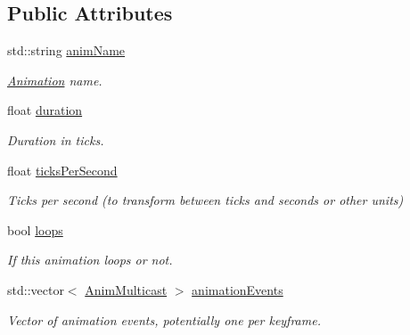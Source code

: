 \subsection*{Public Attributes}
\begin{DoxyCompactItemize}
\item 
\mbox{\label{structAnimation_a0447169235a9232787743cd944752b3f}} 
std\+::string \hyperlink{structAnimation_a0447169235a9232787743cd944752b3f}{anim\+Name}
\begin{DoxyCompactList}\small\item\em \hyperlink{structAnimation}{Animation} name. \end{DoxyCompactList}\item 
\mbox{\label{structAnimation_a66cc7333638f071b0401072ba95c55fd}} 
float \hyperlink{structAnimation_a66cc7333638f071b0401072ba95c55fd}{duration}
\begin{DoxyCompactList}\small\item\em Duration in ticks. \end{DoxyCompactList}\item 
\mbox{\label{structAnimation_a929555773b65c756af1519fc39317560}} 
float \hyperlink{structAnimation_a929555773b65c756af1519fc39317560}{ticks\+Per\+Second}
\begin{DoxyCompactList}\small\item\em Ticks per second (to transform between ticks and seconds or other units) \end{DoxyCompactList}\item 
\mbox{\label{structAnimation_aad5027023051d9891c36539a27e2df3d}} 
bool \hyperlink{structAnimation_aad5027023051d9891c36539a27e2df3d}{loops}
\begin{DoxyCompactList}\small\item\em If this animation loops or not. \end{DoxyCompactList}\item 
\mbox{\label{structAnimation_a20f3a503b821838808d517a2230c4b94}} 
std\+::vector$<$ \hyperlink{structAnimation_ac07104f8333840b8c2fca7fe620ace19}{Anim\+Multicast} $>$ \hyperlink{structAnimation_a20f3a503b821838808d517a2230c4b94}{animation\+Events}
\begin{DoxyCompactList}\small\item\em Vector of animation events, potentially one per keyframe. \end{DoxyCompactList}\item 

\end{DoxyCompactItemize}
